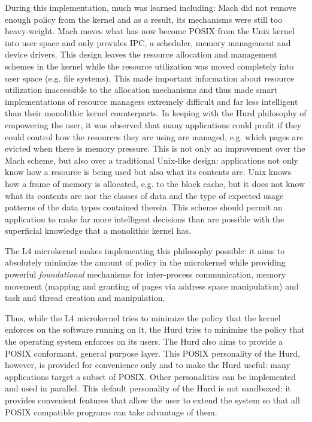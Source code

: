 During this implementation, much was learned including: Mach did not
remove enough policy from the kernel and as a result, its mechanisms
were still too heavy-weight.  Mach moves what has now become POSIX
from the Unix kernel into user space and only provides IPC, a
scheduler, memory management and device drivers.  This design leaves
the resource allocation and management schemes in the kernel while the
resource utilization was moved completely into user space (e.g. file
systems).  This made important information about resource utilization
inaccessible to the allocation mechanisms and thus made smart
implementations of resource managers extremely difficult and far less
intelligent than their monolithic kernel counterparts.  In keeping
with the Hurd philosophy of empowering the user, it was observed that
many applications could profit if they could control how the resources
they are using are managed, e.g. which pages are evicted when there is
memory pressure.  This is not only an improvement over the Mach
scheme, but also over a traditional Unix-like design: applications not
only know how a resource is being used but also what its contents are.
Unix knows how a frame of memory is allocated, e.g. to the block
cache, but it does not know what its contents are nor the classes of
data and the type of expected usage patterns of the data types
contained therein.  This scheme should permit an application to make
far more intelligent decisions than are possible with the superficial
knowledge that a monolithic kernel has.

The L4 microkernel makes implementing this philosophy possible: it
aims to absolutely minimize the amount of policy in the microkernel
while providing powerful \emph{foundational} mechanisms for
inter-process communication, memory movement (mapping and granting of
pages via address space manipulation) and task and thread creation and
manipulation.

Thus, while the L4 microkernel tries to minimize the policy that the
kernel enforces on the software running on it, the Hurd tries to
minimize the policy that the operating system enforces on its users.
The Hurd also aims to provide a POSIX conformant, general purpose
layer.  This POSIX personality of the Hurd, however, is provided for
convenience only and to make the Hurd useful: many applications target
a subset of POSIX.  Other personalities can be implemented and used in
parallel.  This default personality of the Hurd is not sandboxed: it
provides convenient features that allow the user to extend the system
so that all POSIX compatible programs can take advantage of them.

